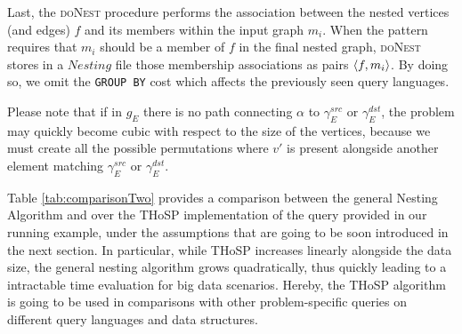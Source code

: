 Last, the \textsc{doNest} procedure performs the association between the nested vertices (and edges) $f$ and its members within the input graph $m_i$. When the pattern requires that $m_i$ should be a member of $f$ in the final nested graph,  \textsc{doNest} stores in a $Nesting$ file those membership associations as pairs $\Braket{f,m_i}$. By doing so, we omit the \texttt{GROUP BY} cost which affects the previously seen query languages. 



Please note that if in $g_E$ there is no path connecting $\alpha$ to $\gamma_E^{src}$ or $\gamma_E^{dst}$, the problem may quickly become cubic with respect to the size of the vertices, because we must create all the possible permutations where $v'$ is present alongside another element matching $\gamma_E^{src}$ or $\gamma_E^{dst}$.


Table \ref{tab:comparisonTwo} provides a comparison between the general Nesting Algorithm and over the THoSP implementation of the query provided in our running example, under the assumptions that are going to be soon introduced in the next section. In particular, while THoSP increases linearly alongside the data size, the general nesting algorithm grows quadratically, thus quickly leading to a intractable time evaluation for big data scenarios. Hereby, the THoSP algorithm is going to be used in comparisons with other problem-specific queries on different query languages and data structures.